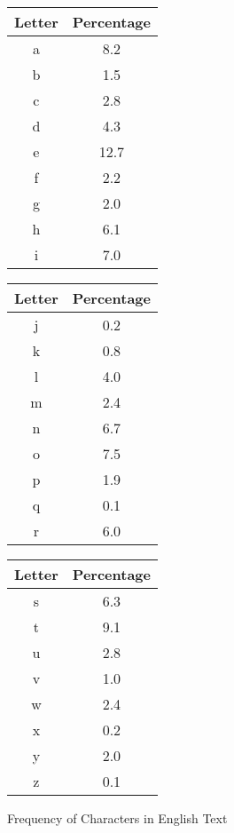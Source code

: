 \documentclass[12pt]{article}
\begin{document}
\begin{figure}[ht]
	\caption{Frequency of Characters in English Text}
	\label{freqchars}
	\begin{center}
		\begin{multicols}{3}
			\begin{tabular}{||c | c||}
				\hline
				Letter & Percentage \\
				\hline\hline
				a & 8.2 \\ 
				\hline
				b & 1.5 \\
				\hline
				c & 2.8 \\
				\hline
				d & 4.3 \\
				\hline
				e & 12.7 \\
				\hline
				f & 2.2 \\
				\hline
				g & 2.0 \\
				\hline
				h & 6.1 \\
				\hline
				i & 7.0 \\
				\hline
			\end{tabular}
			
			\columnbreak
			
			\begin{tabular}{||c | c||}
				\hline
				Letter & Percentage \\
				\hline\hline
				j & 0.2 \\
				\hline
				k & 0.8 \\
				\hline
				l & 4.0 \\
				\hline
				m & 2.4 \\
				\hline
				n & 6.7 \\
				\hline
				o & 7.5 \\
				\hline
				p & 1.9 \\
				\hline
				q & 0.1 \\
				\hline
				r & 6.0 \\
				\hline 
			\end{tabular}
			
			\columnbreak
			
			\begin{tabular}{||c | c||}
				\hline
				Letter & Percentage \\
				\hline\hline
				s & 6.3 \\ 
				\hline 
				t & 9.1 \\
				\hline 
				u & 2.8 \\
				\hline 
				v & 1.0 \\
				\hline 
				w & 2.4 \\
				\hline
				x & 0.2 \\
				\hline
				y & 2.0 \\
				\hline 
				z & 0.1 \\
				\hline 
			\end{tabular}
		\end{multicols}
	\end{center}
	\begin{flushright}
		\cite[pg. 19]{codebook}
	\end{flushright}
\end{figure}
\end{document}
